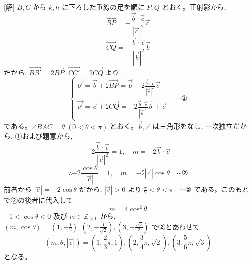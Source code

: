 \documentclass[../main.tex]{subfiles}
\begin{document}
[解] $B, C$ から $k, h$ に下ろした垂線の足を順に $P, Q$ とおく。正射影から,
\[
  \vec{BP} = -\frac{\vec{b} \cdot \vec{c}}{|\vec{c}|^2} \vec{c}
\]
\[
  \vec{CQ} = -\frac{\vec{b} \cdot \vec{c}}{|\vec{b}|^2} \vec{b}
\]
だから, $\vec{BB'} = 2\vec{BP}$, $\vec{CC'} = 2\vec{CQ}$ より,
\[
  \begin{cases}
    \vec{b'} = \vec{b} + 2\vec{BP} = \vec{b} - 2\frac{\vec{b} \cdot \vec{c}}{|\vec{c}|^2} \vec{c} \\
    \vec{c'} = \vec{c} + 2\vec{CQ} = -2\frac{\vec{b} \cdot \vec{c}}{|\vec{b}|^2} \vec{b} + \vec{c}
  \end{cases}
  \quad \cdots \text{①}
\]
である。$\angle BAC = \theta \; (0 < \theta < \pi)$ とおく。$\vec{b}, \vec{c}$ は三角形をなし, 一次独立だから, ①および題意から,
\[
  -2\frac{\vec{b} \cdot \vec{c}}{|\vec{c}|^2} = 1, \quad m = -2\vec{b} \cdot \vec{c}
\]
\[
  \therefore -2 \frac{\cos\theta}{|\vec{c}|} = 1, \quad m = -2|\vec{c}|\cos\theta \quad \cdots \text{②}
\]
前者から $|\vec{c}| = -2\cos\theta$ だから, $|\vec{c}| > 0$ より $\frac{\pi}{2} < \theta < \pi \quad \cdots \text{③}$ である。このもとで②の後者に代入して
\[
  m = 4\cos^2\theta
\]
$-1 < \cos\theta < 0$ 及び $m \in \mathbb{Z}_{>0}$ から, $(m, \cos\theta) = \left(1, -\frac{1}{2}\right), \left(2, -\frac{1}{\sqrt{2}}\right), \left(3, -\frac{\sqrt{3}}{2}\right)$ で②とあわせて
\[
  (m, \theta, |\vec{c}|) = \left(1, \frac{2}{3}\pi, 1\right), \left(2, \frac{3}{4}\pi, \sqrt{2}\right), \left(3, \frac{5}{6}\pi, \sqrt{3}\right)
\]
となる。

\begin{center}
\end{center}
\end{document}

